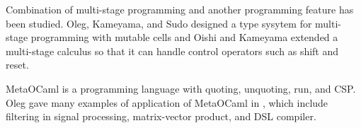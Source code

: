 
Combination of multi-stage programming and another programming feature has been studied.
Oleg, Kameyama, and Sudo\cite{kiselyov2016refined} designed a type sysytem for multi-stage programming with mutable cells and
Oishi and Kameyama\cite{oishi2017staging} extended a multi-stage calculus so that it can handle control operators such as shift and reset.


MetaOCaml is a programming language with quoting, unquoting, run, and CSP.
Oleg gave many examples of application of MetaOCaml in \cite{8384206}, 
which include filtering in signal processing, matrix-vector product, and DSL compiler.

